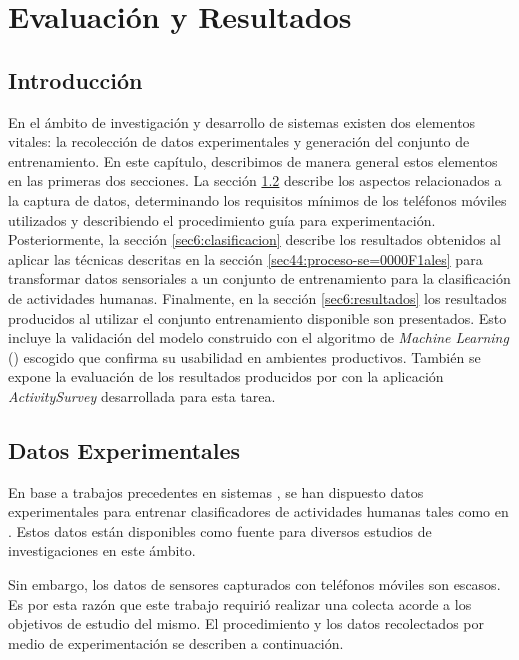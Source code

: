 
\chapter{Evaluación y Resultados}

\label{chap6:evaluacion}

\section{Introducción}

En el ámbito de investigación y desarrollo de sistemas 
existen dos elementos vitales: la recolección de datos experimentales
y generación del conjunto de entrenamiento. En este capítulo, describimos
de manera general estos elementos en las primeras dos secciones. La
sección \ref{sec6:recoleccion} describe los aspectos relacionados
a la captura de datos, determinando los requisitos mínimos de los
teléfonos móviles utilizados y describiendo el procedimiento guía
para experimentación. Posteriormente, la sección \ref{sec6:clasificacion}
describe los resultados obtenidos al aplicar las técnicas descritas
en la sección \ref{sec44:proceso-se=0000F1ales} para transformar
datos sensoriales a un conjunto de entrenamiento para la clasificación
de actividades humanas. Finalmente, en la sección \ref{sec6:resultados}
los resultados producidos al utilizar el conjunto entrenamiento disponible
son presentados. Esto incluye la validación del modelo construido
con el algoritmo de \emph{Machine Learning} () escogido
que confirma su usabilidad en ambientes productivos. También se expone
la evaluación de los resultados producidos por \emph{
}con la aplicación \emph{ActivitySurvey} desarrollada para esta tarea.

\section{Datos Experimentales}

\label{sec6:recoleccion}En base a trabajos precedentes en sistemas
, se han dispuesto datos experimentales para entrenar clasificadores
de actividades humanas tales como en \cite{ReyesOrtiz2013}. Estos
datos están disponibles como fuente para diversos estudios de investigaciones
en este ámbito. 

Sin embargo, los datos de sensores capturados con teléfonos móviles
son escasos. Es por esta razón que este trabajo requirió realizar
una colecta acorde a los objetivos de estudio del mismo. El procedimiento
y los datos recolectados por medio de experimentación se describen
a continuación.

